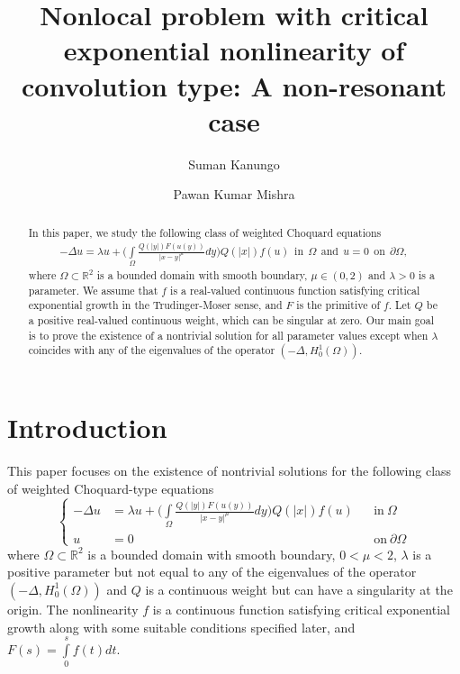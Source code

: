 \documentclass[11pt]{amsart}
\title [ Non-resonant nonlocal problem with critical exponential nonlinearity]{Nonlocal problem with critical exponential nonlinearity of convolution type: A non-resonant case}
\author[Suman Kanungo]{Suman Kanungo}
\author[Pawan Kumar Mishra]{Pawan Kumar Mishra}
\numberwithin{equation}{section}
\newcommand{\R}{\mathbb{R}}
\newcommand{\h}{H^1_0(\Omega)}
\newcommand{\1}{\frac{1}{2}}
\begin{document}
	\begin{abstract}
		In this paper, we study the following class of weighted Choquard equations
		\begin{align*}
			-\Delta u =\lambda u + \Bigg(\displaystyle\int\limits_\Omega \frac{Q(|y|)F(u(y))}{|x-y|^\mu}dy\Bigg) Q(|x|)f(u) ~~\textrm{in}~~ \Omega~~ \text{and}~~
			u=0~~  \textrm{on}~~ \partial \Omega,
		\end{align*}  
		where $\Omega \subset \R^2$ is a bounded domain with smooth boundary, $\mu \in (0,2)$ and $\lambda >0$ is a parameter. We assume that $f$ is a real-valued continuous function satisfying critical exponential growth in the Trudinger-Moser sense, and $F$ is the primitive of $f$. Let $Q$ be a positive real-valued continuous weight, which can be singular at zero. Our main goal is to prove the existence of a nontrivial solution for all parameter values except when $\lambda$ coincides with any of the eigenvalues of the operator $(-\Delta, \h)$.
		
	\end{abstract}
	\maketitle
	\section{Introduction}
	\label{sec1}
	This paper focuses on the existence of nontrivial solutions for the following class of weighted Choquard-type equations
	\begin{equation}
		\label{1.1}
		\left\{
		\begin{aligned}
			-\Delta u &=\lambda u + \Bigg(\displaystyle\int\limits_\Omega \frac{Q(|y|)F(u(y))}{|x-y|^\mu}dy\Bigg) Q(|x|)f(u) &&\mbox{in} \ \Omega\\
			u&=0  &&\mbox{on} \ \partial \Omega
		\end{aligned}
		\right.
	\end{equation}  
	where $\Omega \subset \R^2$ is a bounded domain with smooth boundary, $0<\mu<2$, $\lambda$ is a positive parameter but not equal to any of the eigenvalues of the operator $(-\Delta, \h)$ and $Q$ is a continuous weight but can have a singularity at the origin. The nonlinearity $f$ is a continuous function satisfying critical exponential growth along with some suitable conditions specified later, and $F(s) = \int\limits_0^s f(t)dt$. 
	
\end{document}

